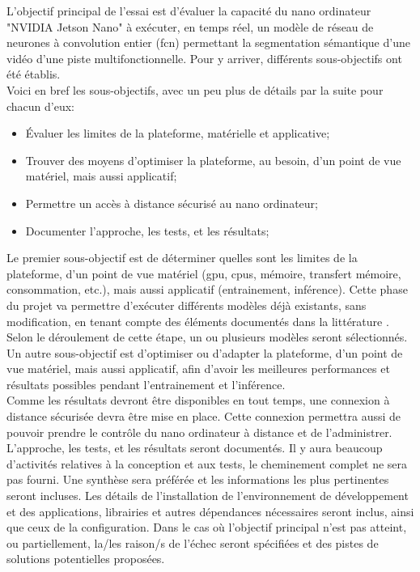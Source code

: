 ﻿\noindent L'objectif principal de l'essai est d'évaluer la capacité du nano ordinateur "NVIDIA Jetson Nano" à exécuter, en temps réel, un modèle de réseau de neurones à convolution entier (\acrshort{fcn}) permettant la segmentation sémantique d'une vidéo d'une piste multifonctionnelle. Pour y arriver, différents sous-objectifs ont été établis. 
\vspace{\baselineskip}
\\
\noindent Voici en bref les sous-objectifs, avec un peu plus de détails par la suite pour chacun d'eux: 
\begin{itemize}
   \item Évaluer les limites de la plateforme, matérielle et applicative; 
   \item Trouver des moyens d'optimiser la plateforme, au besoin, d'un point de vue matériel, mais aussi applicatif; 
   \item Permettre un accès à distance sécurisé au nano ordinateur;
   \item Documenter l'approche, les tests, et les résultats;
\end{itemize}
\vspace{\baselineskip}
\noindent Le premier sous-objectif est de déterminer quelles sont les limites de la plateforme, d'un point de vue matériel (\acrshort{gpu}, \acrshort{cpu}s, mémoire, transfert mémoire, consommation, etc.), mais aussi applicatif (entrainement, inférence). Cette phase du projet va permettre d'exécuter différents modèles déjà existants, sans  modification, en tenant compte des éléments documentés dans la littérature \cite{nguyen_mavnet_2019} \cite{zheng_real-time_2020} \cite{nvidia_jetson_2019-1}. Selon le déroulement de cette étape, un ou plusieurs modèles seront sélectionnés. 
\vspace{\baselineskip}
\\
\noindent Un autre sous-objectif est d'optimiser ou d'adapter la plateforme, d'un point de vue matériel, mais aussi applicatif, afin d'avoir les meilleures performances et résultats possibles pendant l'entrainement et l'inférence.
\vspace{\baselineskip}
\\
\noindent Comme les résultats devront être disponibles en tout temps, une connexion à distance sécurisée devra être mise en place. Cette connexion permettra aussi de pouvoir prendre le contrôle du nano ordinateur à distance et de l'administrer.
\vspace{\baselineskip}
\\
\noindent L'approche, les tests, et les résultats seront documentés. Il y aura beaucoup d'activités relatives à la conception et aux tests, le cheminement complet ne sera pas fourni. Une synthèse sera préférée et les informations les plus pertinentes seront incluses. Les détails de l'installation de l'environnement de développement et des applications, librairies et autres dépendances nécessaires seront inclus, ainsi que ceux de la configuration. Dans le cas où l'objectif principal n'est pas atteint, ou partiellement, la/les raison/s de l'échec seront spécifiées et des pistes de solutions potentielles proposées.